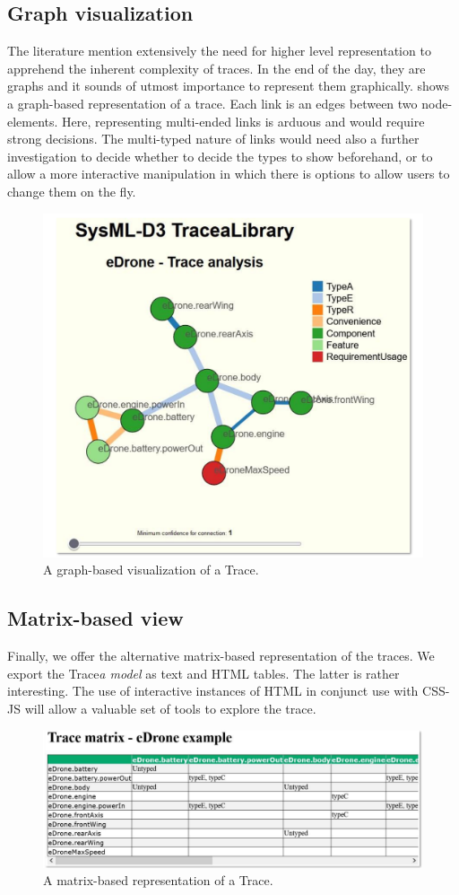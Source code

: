 \subsection{Graph visualization}
The literature mention extensively the need for higher level representation to apprehend the inherent complexity of traces. In the end of the day, they are graphs and it sounds of utmost importance to represent them graphically.  shows a graph-based representation of a trace. Each link is an edges between two node-elements. Here, representing multi-ended links is arduous and would require strong decisions. The multi-typed nature of links would need also a further investigation to decide whether to decide the types to show beforehand, or to allow a more interactive manipulation in which there is options to allow users to change them on the fly.


\begin{figure}[h]
	\centering
	\includegraphics[width=.6\linewidth]{images/visualization1.pdf}
	\caption{A graph-based visualization of a Trace.} 
	\label{fig:visualizationgraph}
\end{figure}

\subsection{Matrix-based view}
Finally, we offer the alternative matrix-based representation of the traces. We export the Trace\textit{a model} as text and HTML tables. The latter is rather interesting. The use of interactive instances of HTML in conjunct use with CSS-JS will allow a valuable set of tools to explore the trace.

\begin{figure}[h]
	\centering
	\includegraphics[width=.85\linewidth]{images/matrix1.pdf}
	\caption{A matrix-based representation of a Trace.}
	\label{fig:matrixview}
\end{figure}

